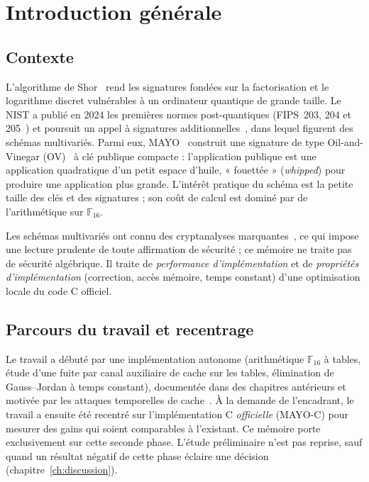 \chapter{Introduction générale}
\label{ch:intro}

\section{Contexte}
L'algorithme de Shor~\cite{shor} rend les signatures fondées sur la factorisation et le logarithme discret vulnérables à un ordinateur quantique de grande taille. Le NIST a publié en 2024 les premières normes post-quantiques (FIPS~203, 204 et 205~\cite{nistfips}) et poursuit un appel à signatures additionnelles~\cite{nistadd}, dans lequel figurent des schémas multivariés. Parmi eux, MAYO~\cite{mayo} construit une signature de type Oil-and-Vinegar (OV)~\cite{patarin,kipnisshamir,uov} à clé publique compacte : l'application publique est une application quadratique d'un petit espace d'huile, « fouettée » (\emph{whipped}) pour produire une application plus grande. L'intérêt pratique du schéma est la petite taille des clés et des signatures ; son coût de calcul est dominé par de l'arithmétique sur $\mathbb{F}_{16}$.

Les schémas multivariés ont connu des cryptanalyses marquantes~\cite{beullensrainbow}, ce qui impose une lecture prudente de toute affirmation de sécurité ; ce mémoire ne traite pas de sécurité algébrique. Il traite de \emph{performance d'implémentation} et de \emph{propriétés d'implémentation} (correction, accès mémoire, temps constant) d'une optimisation locale du code C officiel.

\section{Parcours du travail et recentrage}
Le travail a débuté par une implémentation autonome (arithmétique $\mathbb{F}_{16}$ à tables, étude d'une fuite par canal auxiliaire de cache sur les tables, élimination de Gauss--Jordan à temps constant), documentée dans des chapitres antérieurs et motivée par les attaques temporelles de cache~\cite{kocher,bernstein}. À la demande de l'encadrant, le travail a ensuite été recentré sur l'implémentation C \emph{officielle} (MAYO-C) pour mesurer des gains qui soient comparables à l'existant. Ce mémoire porte exclusivement sur cette seconde phase. L'étude préliminaire n'est pas reprise, sauf quand un résultat négatif de cette phase éclaire une décision (chapitre~\ref{ch:discussion}).

